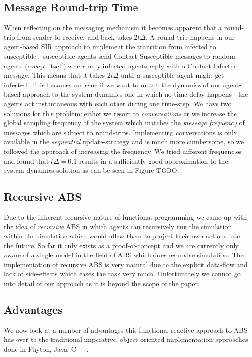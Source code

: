 \subsection{Message Round-trip Time}
When reflecting on the messaging mechanism it becomes apparent that a round-trip from sender to receiver and back takes $2 t\Delta$. A round-trip happens in our agent-based SIR approach to implement the transition from infected to susceptible - susceptible agents send Contact Susceptible messages to random agents (except itself) where only infected agents reply with a Contact Infected message. This means that it takes $2 t\Delta$ until a susceptible agent might get infected. This becomes an issue if we want to match the dynamics of our agent-based approach to the system-dynamics one in which no time-delay happens - the agents act instantaneous with each other during one time-step. 
We have two solutions for this problem: either we resort to \textit{conversations} or we increase the global sampling frequency of the system which matches the \textit{message frequency} of messages which are subject to round-trips. Implementing conversations is only available in the \textit{sequential} update-strategy and is much more cumbersome, so we followed the approach of increasing the frequency. We tried different frequencies and found that $t\Delta = 0.1$ results in a sufficiently good approximation to the system dynamics solution as can be seen in Figure TODO.

\subsection{Recursive ABS}
Due to the inherent recursive nature of functional programming we came up with the idea of \textit{recursive} ABS in which agents can recursively run the simulation within the simulation which would allow them to project their own actions into the future. So far it only exists as a proof-of-concept and we are currently only aware of a single model \cite{gilmer_recursive_2000} in the field of ABS which does recursive simulation. The implementation of recursive ABS is very natural due to the explicit data-flow and lack of side-effects which eases the task very much. Unfortunately we cannot go into detail of our approach as it is beyond the scope of the paper.

\subsection{Advantages}
We now look at a number of advantages this functional reactive approach to ABS has over to the traditional imperative, object-oriented implementation approaches done in Phyton, Java, C++.

